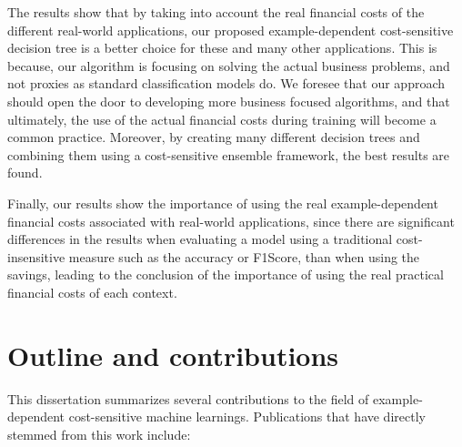   The results show that by taking into account the real financial costs of the different 
  real-world applications, our  proposed example-dependent cost-sensitive decision tree is a better 
  choice for these and many other applications. This is because, our algorithm is focusing on 
  solving the actual business problems,  and not proxies as standard classification models do. We 
  foresee that our approach should open the door to developing more business focused algorithms, 
  and  that ultimately, the use of the actual financial costs during training will become a common 
  practice. Moreover, by creating many different decision trees and combining them using a 
  cost-sensitive ensemble framework, the best results are found.

  Finally, our results show the importance of using the real example-dependent financial costs 
  associated with real-world applications, since there are significant differences in the 
  results when evaluating a model using a traditional cost-insensitive measure such as the 
  accuracy or F1Score,  than when using the savings, leading to the conclusion of the 
  importance of using the real practical financial costs of each context.

\section{Outline and contributions}

This dissertation summarizes several contributions to the field of example-dependent 
cost-sensitive machine learnings. Publications that have directly stemmed from this work 
include:
\bigskip

